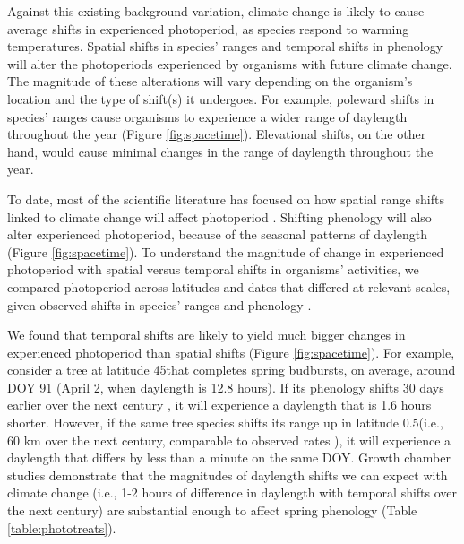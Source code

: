 \documentclass{article}
\begin{document}
\par Against this existing background variation, climate change is likely to cause average shifts in experienced photoperiod, as species respond to warming temperatures. Spatial shifts in species' ranges and temporal shifts in phenology will alter the photoperiods experienced by organisms with future climate change. The magnitude of these alterations will vary depending on the organism's location and the type of shift(s) it undergoes. For example, poleward shifts in species' ranges cause organisms to experience a wider range of daylength throughout the year (Figure \ref{fig:spacetime}). Elevational shifts, on the other hand, would cause minimal changes in the range of daylength throughout the year. %
\par To date, most of the scientific literature has focused on how spatial range shifts linked to climate change will affect photoperiod \citep[e.g.,] []{saikkonen2012, way2015}. Shifting phenology will also alter experienced photoperiod, because of the seasonal patterns of daylength (Figure \ref{fig:spacetime}). To understand the magnitude of change in experienced photoperiod with spatial versus temporal shifts in organisms' activities, we compared photoperiod across latitudes and dates that differed at relevant scales, given observed shifts in species' ranges and phenology \citep{parmesan2003,chen2011}.  
\par We found that temporal shifts are likely to yield much bigger changes in experienced photoperiod than spatial shifts (Figure \ref{fig:spacetime}). For example, consider a tree at latitude 45\degree  that completes spring budbursts, on average, around DOY 91 (April 2, when daylength is 12.8 hours). If its phenology shifts 30 days earlier over the next century \citep[][i.e., a rate of ~3 days per decade, as has been observed]{parmesan2003}, it will experience a daylength that is 1.6 hours shorter. However, if the same tree species shifts its range up in latitude 0.5\degree (i.e., 60 km over the next century,  comparable to observed rates \citep{parmesan2003, chen2011}), it will experience a daylength that differs by less than a minute on the same DOY. Growth chamber studies demonstrate that the magnitudes of daylength shifts we can expect with climate change (i.e., 1-2 hours of difference in daylength with temporal shifts over the next century) are substantial enough to affect spring phenology (Table \ref{table:phototreats}).  
\end{document}
